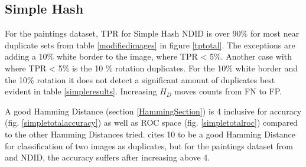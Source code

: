 \documentclass[english,12pt,a4paper,pdftex,elec,utf8]{aaltothesis}
\begin{document}
\subsection{Simple Hash}
For the paintings dataset, TPR for Simple Hash NDID is over 90\% for most near duplicate sets from table \ref{modifiedimages} in figure \ref{tptotal}. The exceptions are adding a 10\% white border to the image, where TPR < 5\%. Another case with where TPR < 5\% is the 10 \% rotation duplicates. For the 10\% white border and the 10\% rotation it does not detect a significant amount of duplicates best evident in table \ref{simpleresults}. Increasing $H_D$ moves counts from FN to FP.

A good Hamming Distance (section \ref{HammingSection}) is 4 inclusive for accuracy (fig. \ref{simpletotalaccuracy}) as well as ROC space (fig. \ref{simpletotalroc}) compared to the other Hamming Distances tried. \cite{Zauner2010} cites 10 to be a good Hamming Distance for classification of two images as duplicates, but for the paintings dataset from \cite{Vedaldi2012} and NDID, the accuracy suffers after increasing above 4.
\end{document}
